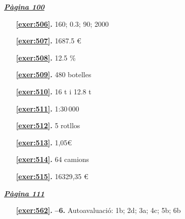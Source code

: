 \hyperlink{page.100}{\textbf{\em Pàgina 100}}
\begin{enumerate}
\item[\fontfamily{phv}\selectfont\color{blue}\textbf{\ref{exer:506}. }] \label{ans:506} 
160; 0.3; 90; 2000
 \end{enumerate}
\begin{enumerate}
\item[\fontfamily{phv}\selectfont\color{blue}\textbf{\ref{exer:507}. }] \label{ans:507} 
1687.5 \euro {}
\item[\fontfamily{phv}\selectfont\color{blue}\textbf{\ref{exer:508}. }] \label{ans:508} 
12.5 \%
\item[\fontfamily{phv}\selectfont\color{blue}\textbf{\ref{exer:509}. }] \label{ans:509} 
480 botelles
\item[\fontfamily{phv}\selectfont\color{blue}\textbf{\ref{exer:510}. }] \label{ans:510} 
16 t i 12.8 t
\item[\fontfamily{phv}\selectfont\color{blue}\textbf{\ref{exer:511}. }] \label{ans:511} 
1:30\,000
\item[\fontfamily{phv}\selectfont\color{blue}\textbf{\ref{exer:512}. }] \label{ans:512} 
5 rotllos
\item[\fontfamily{phv}\selectfont\color{blue}\textbf{\ref{exer:513}. }] \label{ans:513} 
1,05\euro {}
\item[\fontfamily{phv}\selectfont\color{blue}\textbf{\ref{exer:514}. }] \label{ans:514} 
64 camions
\item[\fontfamily{phv}\selectfont\color{blue}\textbf{\ref{exer:515}. }] \label{ans:515} 
16329,35 \euro {}
 \end{enumerate}

 \vspace{1cm} 
 

\vspace{0.3cm}


\hyperlink{page.111}{\textbf{\em Pàgina 111}}
\begin{enumerate}
\item[\fontfamily{phv}\selectfont\color{blue}\textbf{\ref{exer:562}. }] \label{ans:562} 
\textbf {--6.} Autoavaluació: 1b; 2d; 3a; 4c; 5b; 6b
 \end{enumerate}

